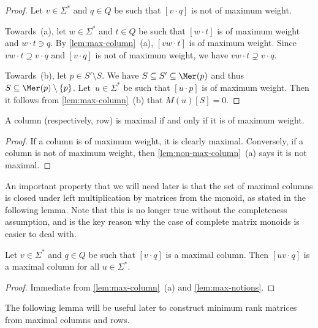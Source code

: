 \begin{proof}
Let $v \in \Sigma^*$ and $q \in Q$ be such that $[v \cdot q]$ is not of maximum weight.

Towards~(a), let $w \in \Sigma^*$ and $t \in Q$ be such that $[w \cdot t]$ is of maximum weight and $w \cdot t \ni q$.
By \autoref{lem:max-column}~(a), $[v w \cdot t]$ is of maximum weight.
Since $v w \cdot t \supseteq v \cdot q$ and $[v \cdot q]$ is not of maximum weight, we have $v w \cdot t \supsetneq v \cdot q$.

Towards~(b), let $p \in S' \setminus S$.
We have $S \subseteq S' \subseteq \Mer(p)$ and thus $S \subseteq \Mer(p) \setminus \{p\}$.
Let~$u \in \Sigma^*$ be such that $[u \cdot p]$ is of maximum weight.
Then it follows from \autoref{lem:max-column}~(b) that $M(u) [S] = 0$.
\end{proof}

\begin{lem} \label{lem:max-notions}
    A column (respectively, row) is maximal if and only if it is of maximum weight.
\end{lem}
\begin{proof}
If a column is of maximum weight, it is clearly maximal.
Conversely, if a column is not of maximum weight, then \autoref{lem:non-max-column}~(a) says it is not maximal.
\end{proof}

\noindent
An important property that we will need later is that the set of maximal columns is closed under left multiplication by matrices from the monoid, as stated in the following lemma. Note that this is no longer true without the completeness assumption, and is the key reason why the case of complete matrix monoids is easier to deal with.

\begin{lem} \label{lem:max-column-stable}
Let $v \in \Sigma^*$ and $q \in Q$ be such that $[v \cdot q]$ is a maximal column. Then $[u v \cdot q]$ is a maximal column for all $u \in \Sigma^*$.
\end{lem}
\begin{proof}
Immediate from \autoref{lem:max-column}~(a) and \autoref{lem:max-notions}.
\end{proof}

\noindent
The following lemma will be useful later to construct minimum rank matrices from maximal columns and rows.

